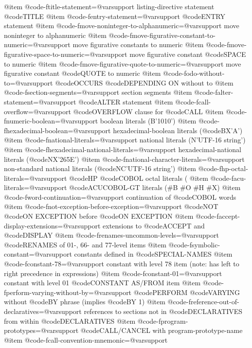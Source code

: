 @item @code{-ftitle-statement=@var{support}}
listing-directive statement @code{TITLE}
@item @code{-fentry-statement=@var{support}}
@code{ENTRY} statement
@item @code{-fmove-noninteger-to-alphanumeric=@var{support}}
move noninteger to alphanumeric
@item @code{-fmove-figurative-constant-to-numeric=@var{support}}
move figurative constants to numeric
@item @code{-fmove-figurative-space-to-numeric=@var{support}}
move figurative constant @code{SPACE} to numeric
@item @code{-fmove-figurative-quote-to-numeric=@var{support}}
move figurative constant @code{QUOTE} to numeric
@item @code{-fodo-without-to=@var{support}}
@code{OCCURS} @code{DEPENDING ON} without to
@item @code{-fsection-segments=@var{support}}
section segments
@item @code{-falter-statement=@var{support}}
@code{ALTER} statement
@item @code{-fcall-overflow=@var{support}}
@code{OVERFLOW} clause for @code{CALL}
@item @code{-fnumeric-boolean=@var{support}}
boolean literals (B'1010')
@item @code{-fhexadecimal-boolean=@var{support}}
hexadecimal-boolean literals (@code{BX}'A')
@item @code{-fnational-literals=@var{support}}
national literals (N'UTF-16 string')
@item @code{-fhexadecimal-national-literals=@var{support}}
hexadecimal-national literals (@code{NX}'265E')
@item @code{-fnational-character-literals=@var{support}}
non-standard national literals (@code{NC}'UTF-16 string')
@item @code{-fhp-octal-literals=@var{support}}
@code{HP} @code{COBOL} octal literals (%
@item @code{-facu-literals=@var{support}}
@code{ACUCOBOL-GT} literals (#B #O #H #X)
@item @code{-fword-continuation=@var{support}}
continuation of @code{COBOL} words
@item @code{-fnot-exception-before-exception=@var{support}}
@code{NOT} @code{ON EXCEPTION} before @code{ON EXCEPTION}
@item @code{-faccept-display-extensions=@var{support}}
extensions to @code{ACCEPT} and @code{DISPLAY}
@item @code{-frenames-uncommon-levels=@var{support}}
@code{RENAMES} of 01-, 66- and 77-level items
@item @code{-fsymbolic-constant=@var{support}}
constants defined in @code{SPECIAL-NAMES}
@item @code{-fconstant-78=@var{support}}
constant with level 78 item (note: has left to right precedence in expressions)
@item @code{-fconstant-01=@var{support}}
constant with level 01 @code{CONSTANT AS}/FROM item
@item @code{-fperform-varying-without-by=@var{support}}
@code{PERFORM} @code{VARYING} without @code{BY} phrase (implies @code{BY} 1)
@item @code{-freference-out-of-declaratives=@var{support}}
references to sections not in @code{DECLARATIVES} from within @code{DECLARATIVES}
@item @code{-fprogram-prototypes=@var{support}}
@code{CALL}/CANCEL with program-prototype-name
@item @code{-fcall-convention-mnemonic=@var{support}}
